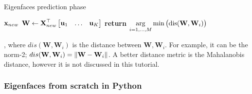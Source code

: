 \documentclass[a4paper]{article}
\begin{document}
\begin{algorithm}[H]
\caption{Eigenfaces prediction phase}
\label{alg:first_draft_mean_shift}
\begin{algorithmic}[1]
	 {$\textbf{x}_{new}$} 
	\State $\textbf{W} \leftarrow \textbf{X}_{new}^{\top} \begin{bmatrix}
		\textbf{u}_1 & \ldots & \textbf{u}_K 	
	\end{bmatrix}$ 
	\State \textbf{return} $\underset{i=1,\ldots,M}{\arg}\min \big (\textup{dis}({\textbf{W}, \textbf{W}_i})\big)$
\EndProcedure
\end{algorithmic}
\end{algorithm}
, where $dis(\textbf{W}, \textbf{W}_i)$ is the distance between $\textbf{W}, \textbf{W}_i$. For example, it can be the norm-2; $dis(\textbf{W}, \textbf{W}_i) = \left\lVert\textbf{W} - \textbf{W}_i\right\rVert$. A better distance metric is the Mahalanobis distance, however it is not discussed in this tutorial.



\subsubsection{Eigenfaces from scratch in Python}
\end{document}
